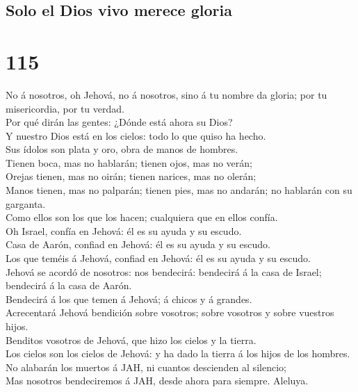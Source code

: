 \hypertarget{solo-el-dios-vivo-merece-gloria}{%
\subsection{Solo el Dios vivo merece
gloria}\label{solo-el-dios-vivo-merece-gloria}}

\hypertarget{section-114}{%
\section{115}\label{section-114}}

 No á nosotros, oh Jehová, no á nosotros, sino á tu nombre
da gloria; por tu misericordia, por tu verdad.\\
 Por qué dirán las gentes: ¿Dónde está ahora su Dios?\\
 Y nuestro Dios está en los cielos: todo lo que quiso ha
hecho.\\
 Sus ídolos son plata y oro, obra de manos de hombres.\\
 Tienen boca, mas no hablarán; tienen ojos, mas no verán;\\
 Orejas tienen, mas no oirán; tienen narices, mas no
olerán;\\
 Manos tienen, mas no palparán; tienen pies, mas no andarán;
no hablarán con su garganta.\\
 Como ellos son los que los hacen; cualquiera que en ellos
confía.\\
 Oh Israel, confía en Jehová: él es su ayuda y su escudo.\\
 Casa de Aarón, confiad en Jehová: él es su ayuda y su
escudo.\\
 Los que teméis á Jehová, confiad en Jehová: él es su ayuda
y su escudo.\\
 Jehová se acordó de nosotros: nos bendecirá: bendecirá á
la casa de Israel; bendecirá á la casa de Aarón.\\
 Bendecirá á los que temen á Jehová; á chicos y á
grandes.\\
 Acrecentará Jehová bendición sobre vosotros; sobre
vosotros y sobre vuestros hijos.\\
 Benditos vosotros de Jehová, que hizo los cielos y la
tierra.\\
 Los cielos son los cielos de Jehová: y ha dado la tierra á
los hijos de los hombres.\\
 No alabarán los muertos á JAH, ni cuantos descienden al
silencio;\\
 Mas nosotros bendeciremos á JAH, desde ahora para siempre.
Aleluya.

